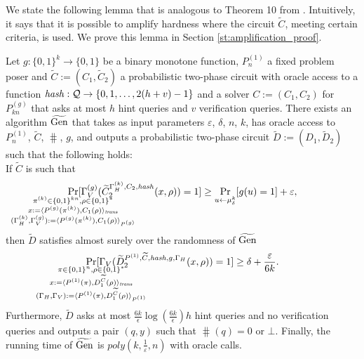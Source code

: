 %
We state the following lemma that is analogous to Theorem 10 from \cite{holenstein2011general}.
Intuitively, it says that it is possible to amplify hardness where the circuit $\widetilde{C}$, meeting certain criteria, is used.
We prove this lemma in Section \ref{st:amplification_proof}.
\begin{lemma}
  \label{lemma:sec_amp_for_p_hash}
  Let $g: \{0,1\}^{k} \rightarrow \{0,1\}$ be a binary monotone function, $P_n^{(1)}$ a fixed
  problem poser and $\widetilde{C} := (C_1, \widetilde{C}_2)$ a probabilistic two-phase circuit
  with oracle access to a function $\operatorname{\mathit{hash}}: \mathcal{Q} \rightarrow \{0,1,\dots, 2(h+v)-1\}$
  and a solver $C := (C_1, C_2)$ for $P_{kn}^{(g)}$ that asks at most $h$ hint queries and $v$ verification queries.
  There exists an algorithm $\widetilde{\operatorname{\text{Gen}}}$ that takes as input parameters $\varepsilon$, $\delta$, $n$, $k$,
  has oracle access to $P_n^{(1)}$,  $\widetilde{C}$, $\hash$, $g$,
  and outputs a probabilistic two-phase circuit $\widetilde{D} := (D_1, \widetilde{D}_2)$ such that the following holds: \\
  If $\widetilde{C}$ is such that
  \begin{align*}
    \underset{\mathclap{\substack{
          \pi^{(k)} \in \{0,1\}^{kn}, \rho \in \{0,1\}^{*} \\
          x:= \langle P^{(g)}(\pi^{(k)}), {C}_1(\rho) \rangle_{\mathit{trans}} \\
          (\Gamma_H^{(k)}, \Gamma_V^{(g)}) := \langle P^{(g)}(\pi^{(k)}), C_1(\rho) \rangle_{P^{(g)}}}}}
    {\Pr}[\Gamma_V^{(g)}(\widetilde{C}_2^{\Gamma_H^{(k)}, C_2, \hash}(x,\rho)) = 1]
    \geq \underset{u \leftarrow \mu_\delta^k}{\Pr}[g(u) = 1] + \varepsilon,
  \end{align*}
  then $\widetilde{D}$ satisfies almost surely over the randomness of $\widetilde{\operatorname{\text{Gen}}}$
  \begin{align*}
    \underset{
      \mathclap{
      \substack{
        \pi \in \{0,1\}^{n}, \rho \in \{0,1\}^{*} \\
        x := \langle P^{(1)}(\pi), D_1^{\widetilde{C}}(\rho) \rangle_{\mathit{trans}} \\
        (\Gamma_H, \Gamma_V) := \langle P^{(1)}(\pi), D_1^{\widetilde{C}}(\rho) \rangle_{P^{(1)}}}}}
    {\Pr}[\Gamma_V(\widetilde{D}_2^{P^{(1)}, \widetilde{C}, \hash, g, \Gamma_H}(x, \rho)) = 1] \geq \delta + \frac{\varepsilon}{6k}.
  \end{align*}
  Furthermore, $\widetilde{D}$ asks at most $\frac{6k}{\epsilon}\log\left(\frac{6k}{\epsilon}\right) h$ hint queries and no verification queries
  and outputs a pair $(q, y)$ such that $\hash(q) = 0$ or $\bot$.
  Finally, the running time of $\widetilde{\operatorname{\text{Gen}}}$ is $poly(k, \frac{1}{\varepsilon}, n)$ with oracle calls.
\end{lemma}
